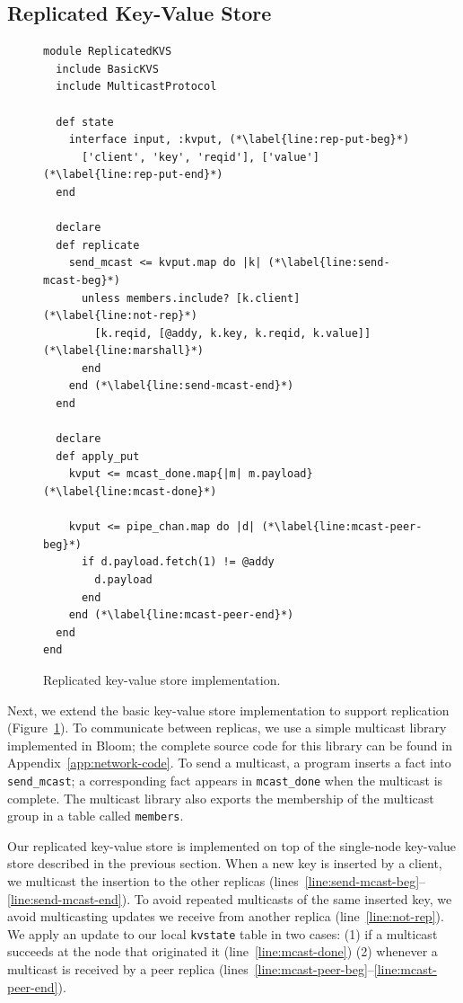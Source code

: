\subsection{Replicated Key-Value Store}
\label{sec:rep-kvs}

\begin{figure}[t]
\begin{scriptsize}
\begin{lstlisting}
module ReplicatedKVS
  include BasicKVS
  include MulticastProtocol

  def state
    interface input, :kvput, (*\label{line:rep-put-beg}*)
      ['client', 'key', 'reqid'], ['value']  (*\label{line:rep-put-end}*)
  end

  declare
  def replicate
    send_mcast <= kvput.map do |k| (*\label{line:send-mcast-beg}*)
      unless members.include? [k.client]  (*\label{line:not-rep}*)
        [k.reqid, [@addy, k.key, k.reqid, k.value]]   (*\label{line:marshall}*)            
      end
    end (*\label{line:send-mcast-end}*)
  end

  declare
  def apply_put
    kvput <= mcast_done.map{|m| m.payload}  (*\label{line:mcast-done}*)

    kvput <= pipe_chan.map do |d| (*\label{line:mcast-peer-beg}*)
      if d.payload.fetch(1) != @addy
        d.payload
      end
    end (*\label{line:mcast-peer-end}*)
  end
end
\end{lstlisting}
\vspace{-10pt}
\caption{Replicated key-value store implementation.}
\label{fig:kvs-repl}
\end{scriptsize}
\vspace{-2pt}
\end{figure}

Next, we extend the basic key-value store implementation to support replication
(Figure~\ref{fig:kvs-repl}). To communicate between replicas, we use a simple
multicast library implemented in Bloom; the complete source code for this
library can be found in Appendix~\ref{app:network-code}. To send a multicast, a
program inserts a fact into \texttt{send\_mcast}; a corresponding fact appears
in \texttt{mcast\_done} when the multicast is complete. The multicast library
also exports the membership of the multicast group in a table called
\texttt{members}.

Our replicated key-value store is implemented on top of the single-node
key-value store described in the previous section. When a new key is inserted by
a client, we multicast the insertion to the other replicas
(lines~\ref{line:send-mcast-beg}--\ref{line:send-mcast-end}). To avoid repeated
multicasts of the same inserted key, we avoid multicasting updates we receive
from another replica (line~\ref{line:not-rep}). We apply an update to our local
\texttt{kvstate} table in two cases: (1) if a multicast succeeds at the node
that originated it (line~\ref{line:mcast-done}) (2) whenever a multicast is
received by a peer replica
(lines~\ref{line:mcast-peer-beg}--\ref{line:mcast-peer-end}).

